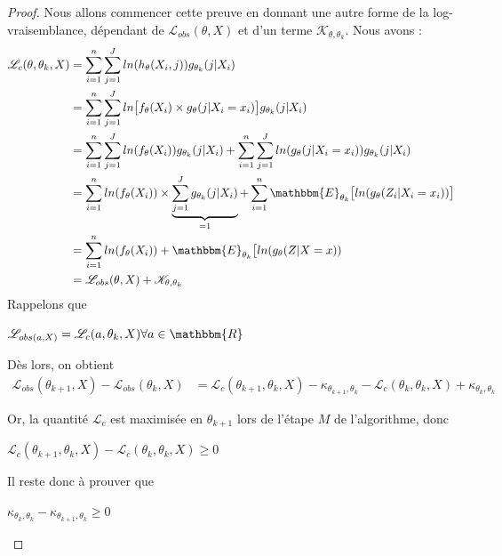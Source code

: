 \documentclass[frenchb]{report}
\newcommand{\R}{\mathbbm{R}}
\newcommand{\1}{\mathbbm{1}}
\newcommand{\E}{\mathbbm{E}}
\newcommand{\K}{\mathcal{K}}
\newcommand{\lv}{\mathcal{L}}
\theoremstyle{definition}\newtheorem{defn}{Définition}
\theoremstyle{definition}\newtheorem{exm}{Exemple}
\theoremstyle{definition}\newtheorem{nota}{Notation}
\theoremstyle{definition}\newtheorem{rem}{Remarque}
\begin{document}
\begin{proof}

Nous allons commencer cette preuve en donnant une autre forme de la log-vraisemblance, dépendant de $\lv_ {obs}(\theta, X)$ et d'un terme $\K_{\theta,\theta_k}$. Nous avons :
\begin{align*}
\lv_c(\theta, \theta_k, X) &=  \displaystyle\sum_{i=1}^n\sum_{j=1}^J ln(h_\theta(X_i ,j))  g_{\theta_k}(j|X_i)\\
&=  \displaystyle\sum_{i=1}^n\sum_{j=1}^J ln\big[f_\theta(X_i)\times g_\theta(j|X_i=x_i)\big]g_{\theta_k}(j|X_i)\\
&=  \displaystyle\sum_{i=1}^n\sum_{j=1}^J ln(f_\theta(X_i))g_{\theta_k}(j|X_i) + \sum_{i=1}^n\sum_{j=1}^J ln(g_\theta(j|X_i=x_i))g_{\theta_k}(j|X_i)\\
&= \displaystyle\sum_{i=1}^n ln(f_\theta(X_i))\times\underbrace{\sum_{j=1}^J g_{\theta_k}(j|X_i)}_{=1} +\sum_{i=1}^n \E_{\theta_k}\big[ln(g_\theta(Z_i|X_i=x_i)) \big]\\
&= \displaystyle\sum_{i=1}^n ln(f_\theta(X_i)) + \E_{\theta_k}\big[ln(g_\theta(Z|X=x)) \\
&= \lv_{obs}(\theta, X) + \K_{\theta,\theta_k}
\end{align*}
Rappelons que
\begin{center} $\lv_{obs(a, X)} = \lv_c(a,\theta_k, X) \forall a \in \R$ \end{center}

Dès lors, on obtient
\begin{align*}
\lv_{obs}(\theta_{k+1}, X) - \lv_{obs}(\theta_k, X) &= \lv_c(\theta_{k+1}, \theta_k, X) - \kappa_{\theta_{k+1}, \theta_k} -  \lv_c(\theta_k, \theta_k, X) + \kappa_{\theta_{k}, \theta_k}
\end{align*}

Or, la quantité $\lv_c$ est maximisée en $\theta_{k+1}$ lors de l'étape $M$ de l'algorithme, donc
\begin{center} $ \lv_c(\theta_{k+1}, \theta_k, X) - \lv_c(\theta_k, \theta_k, X) \geq 0$ \end{center}

Il reste donc à prouver que 
\begin{center} $\kappa_{\theta_{k}, \theta_k}-\kappa_{\theta_{k+1}, \theta_k} \geq 0$ \end{center}


\end{proof}
\end{document}
